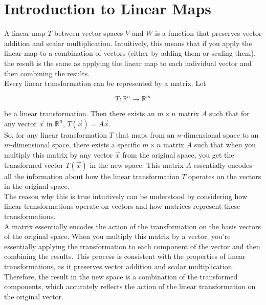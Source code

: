 \section{Introduction to Linear Maps}

A linear map \( T \) between vector spaces \( V \) and \( W \) is a function that preserves vector addition and scalar multiplication. Intuitively, this means that if you apply the linear map to a combination of vectors (either by adding them or scaling them), the result is the same as applying the linear map to each individual vector and then combining the results.
\\

Every linear transformation can be represented by a matrix. Let 

\[ T: \mathbb{R}^n \rightarrow \mathbb{R}^m \]

be a linear transformation. Then there exists an \( m \times n \) matrix \( A \) such that for any vector \( \vec {x} \) in \( \mathbb{R}^n \), \( T(\vec {x}) = A\vec {x} \).
\\

So, for any linear transformation $T$ that maps from an $n$-dimensional space to an $m$-dimensional space, there exists a specific $m \times n$ matrix $A$ such that when you multiply this matrix by any vector $\vec{x}$ from the original space, you get the transformed vector $T(\vec{x})$ in the new space. This matrix $A$ essentially encodes all the information about how the linear transformation $T$ operates on the vectors in the original space.
\\

The reason why this is true intuitively can be understood by considering how linear transformations operate on vectors and how matrices represent these transformations. 
\\

A matrix essentially encodes the action of the transformation on the basis vectors of the original space. When you multiply this matrix by a vector, you're essentially applying the transformation to each component of the vector and then combining the results. This process is consistent with the properties of linear transformations, as it preserves vector addition and scalar multiplication. 
\\

Therefore, the result in the new space is a combination of the transformed components, which accurately reflects the action of the linear transformation on the original vector.

